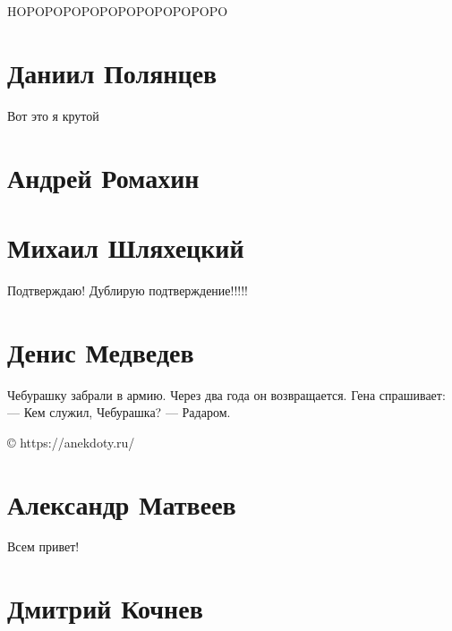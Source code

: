 \documentclass{article}
\begin{document}
HOPOPOPOPOPOPOPOPOPOPOPO


\section *{Даниил Полянцев}
Вот это я крутой
\section*{Андрей Ромахин}

\section*{Михаил Шляхецкий}

Подтверждаю! Дублирую подтверждение!!!!!

\section*{Денис Медведев}

Чебурашку забрали в армию. Через два года он возвращается. Гена спрашивает:
— Кем служил, Чебурашка?
— Радаром.

© https://anekdoty.ru/
\section*{Александр Матвеев}

Всем привет!


\section*{Дмитрий Кочнев}
\end{document}
